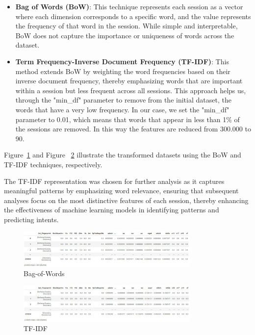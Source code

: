         \begin{itemize}
        
            \item \textbf{Bag of Words (BoW)}: This technique represents each session as a vector where each dimension corresponds to a specific word, and the value represents the frequency of that word in the session. While simple and interpretable, BoW does not capture the importance or uniqueness of words across the dataset.
            
            \vspace{0.3em}
            
            \item \textbf{Term Frequency-Inverse Document Frequency (TF-IDF)}: This method extends BoW by weighting the word frequencies based on their inverse document frequency, thereby emphasizing words that are important within a session but less frequent across all sessions. This approach helps us, through the "min\_df" parameter to remove from the initial dataset, the words that have a very low frequency. In our case, we set the "min\_df" parameter to 0.01, which means that words that appear in less than 1\% of the sessions are removed. In this way the features are reduced from 300.000 to 90.
            
        \end{itemize}

        Figure~\ref{fig:bow} and Figure ~\ref{fig:tf-idf} illustrate the transformed datasets using the BoW and TF-IDF techniques, respectively.
        
        \noindent The TF-IDF representation was chosen for further analysis as it captures meaningful patterns by emphasizing word relevance, ensuring that subsequent analyses focus on the most distinctive features of each session, thereby enhancing the effectiveness of machine learning models in identifying patterns and predicting intents.

        \begin{figure}[H]
            \centering
            \includegraphics[width=0.80\textwidth]{../figures/others/dataset_bow_1.png}
            \vspace{-0.3cm}
            \caption{Bag-of-Words}
            \label{fig:bow}
        \end{figure}
        
        \vspace{-0.5cm}
        
        \begin{figure}[H]
            \centering
            \includegraphics[width=0.80\textwidth]{../figures/others/dataset_tf-idf_1.png}
            \vspace{-0.3cm}
            \caption{TF-IDF}
            \label{fig:tf-idf}
        \end{figure}
